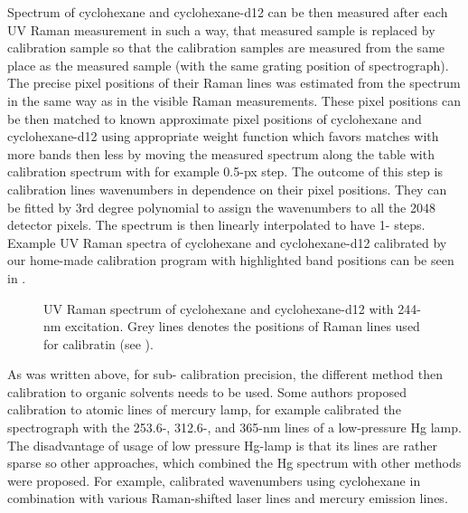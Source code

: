 \begin{table}
	\centering
	
	\caption{%
		Estimated wavenumbers $\tilde{\nu}$ of cyclohexane (H) and cyclohexane-d12
		(D) with the corresponding pixel positions $x$ from UV Raman measurement.%
	}
	\label{\tablabel{wavenumber_calibration:cyclohexane_wavenumbers}}
\end{table}

Spectrum of cyclohexane and cyclohexane-d12 can be then measured after each
UV Raman measurement in such a way, that measured sample is replaced by
calibration sample so that the calibration samples are measured from the same
place as the measured sample (with the same grating position of spectrograph).
The precise pixel positions of their Raman lines was estimated from the
spectrum in the same way as in the visible Raman measurements. These pixel
positions can be then matched to known approximate pixel positions of
cyclohexane and cyclohexane-d12 using appropriate weight function which
favors matches with more bands then less by moving the measured spectrum along
the table with calibration spectrum with for example 0.5-px step. The outcome
of this step is calibration lines wavenumbers in dependence on their pixel
positions. They can be fitted by 3rd degree polynomial to assign the
wavenumbers to all the 2048 detector pixels. The spectrum is then linearly
interpolated to have 1-\icm{} steps. Example UV Raman spectra of cyclohexane
and cyclohexane-d12 calibrated by our home-made calibration program with
highlighted band positions can be seen in
.

\begin{figure}
	\centering
	
	\caption{%
		UV Raman spectrum of cyclohexane and cyclohexane-d12 with 244-nm
		excitation. Grey lines denotes the positions of Raman lines used for
		calibratin (see
		).%
	}
	\label{\figlabel{wavenumber_calibration:cyclohexane_spc}}
\end{figure}

As was written above, for sub-\icm{} calibration precision, the different
method then calibration to organic solvents needs to be used. Some authors
proposed calibration to atomic lines of mercury lamp, for example
\textcite{Manoharan1990,Efremov1991} calibrated the spectrograph with the
253.6-, 312.6-, and 365-nm lines of a low-pressure Hg lamp. The disadvantage
of usage of low pressure Hg-lamp is that its lines are rather sparse so
other approaches, which combined the Hg spectrum with other methods were
proposed. For example, \textcite{Myers1988} calibrated wavenumbers using
cyclohexane in combination with various  Raman-shifted laser lines and
mercury emission lines.

